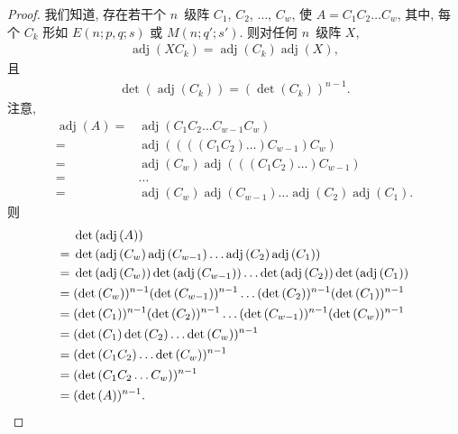 \documentclass[../libro.tex]{subfiles}
\begin{document}
\begin{proof}
    我们知道,
    存在若干个 \(n\)~级阵
    \(C_1\), \(C_2\), \(\dots\), \(C_w\),
    使 \(A = C_1 C_2 \dots C_w\),
    其中, 每个 \(C_k\) 形如
    \(E(n; p, q; s)\) 或 \(M(n; q'; s')\).
    则对任何 \(n\)~级阵 \(X\),
    \begin{align*}
        \operatorname{adj} {(X C_k)}
        = \operatorname{adj} {(C_k)} \operatorname{adj} {(X)},
    \end{align*}
    且
    \begin{align*}
        \det {(\operatorname{adj} {(C_k)})}
        = (\det {(C_k)})^{n-1}.
    \end{align*}
    注意,
    \begin{align*}
        \operatorname{adj} {(A)}
        = {} &
        \operatorname{adj} {(C_1 C_2 \dots C_{w-1} C_w)}
        \\
        = {} &
        \operatorname{adj} {((((C_1 C_2) \dots) C_{w-1}) C_w)}
        \\
        = {} &
        \operatorname{adj} {(C_w)}
        \operatorname{adj} {(((C_1 C_2) \dots) C_{w-1})}
        \\
        = {} &
        \dots
        \\
        = {} &
        \operatorname{adj} {(C_w)}
        \operatorname{adj} {(C_{w-1})}
        \dots
        \operatorname{adj} {(C_2)}
        \operatorname{adj} {(C_1)}.
    \end{align*}
    则
    \begin{align*}
        &
        \det {(\operatorname{adj} {(A)})}
        \\
        = {} &
        \det {(\operatorname{adj} {(C_w)}
                \operatorname{adj} {(C_{w-1})}
                \dots
                \operatorname{adj} {(C_2)}
        \operatorname{adj} {(C_1)})}
        \\
        = {} &
        \det {(\operatorname{adj} {(C_w)})}
        \det {(\operatorname{adj} {(C_{w-1})})}
        \dots
        \det {(\operatorname{adj} {(C_2)})}
        \det {(\operatorname{adj} {(C_1)})}
        \\
        = {} &
        (\det {(C_w)})^{n-1}
        (\det {(C_{w-1})})^{n-1}
        \dots
        (\det {(C_2)})^{n-1}
        (\det {(C_1)})^{n-1}
        \\
        = {} &
        (\det {(C_1)})^{n-1}
        (\det {(C_2)})^{n-1}
        \dots
        (\det {(C_{w-1})})^{n-1}
        (\det {(C_w)})^{n-1}
        \\
        = {} &
        (\det {(C_1)} \det {(C_2)} \dots \det {(C_w)})^{n-1}
        \\
        = {} &
        (\det {(C_1 C_2)} \dots \det {(C_w)})^{n-1}
        \\
        = {} &
        (\det {(C_1 C_2 \dots C_w)})^{n-1}
        \\
        = {} &
        (\det {(A)})^{n-1}.
        \qedhere
    \end{align*}
\end{proof}
\end{document}
